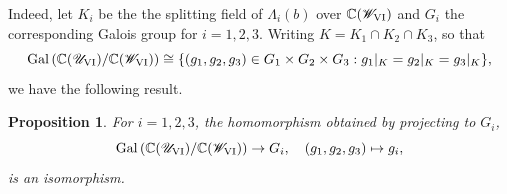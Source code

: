 \documentclass[a4paper,reqno]{amsart}
\numberwithin{equation}{section}
\newcommand{\C}{\mathbb{C}}
\newtheorem{proposition}[theorem]{Proposition}
\numberwithin{equation}{section}
\begin{document}
Indeed, let $K_i$ be the the splitting field of $\Lambda_i(b)$ over $\C(\mathscr{W}_{\rm{VI}})$ and $G_i$ the corresponding Galois group for $i=1,2,3$.
Writing $K=K_1\cap K_2\cap K_3$, so that 
\begin{equation*}
\operatorname{Gal}\left(\C(\mathscr{U}_{\rm{VI}})/\C(\mathscr{W}_{\rm{VI}})\right)\cong \{(g_1,g_2,g_3)\in G_1\times G_2\times G_3: g_1|_K=g_2|_K=g_3|_K\},
\end{equation*}
we have the following result.
\begin{proposition} \label{prop:galoisprojection}
For $i=1,2,3$, the homomorphism obtained by projecting to  $G_i$,
    \begin{equation}\label{eq:projectionG1}
 \operatorname{Gal}\left(\C(\mathscr{U}_{\rm{VI}})/\C(\mathscr{W}_{\rm{VI}})\right)\rightarrow G_i, \quad (g_1,g_2,g_3)\mapsto g_i,
\end{equation}
is an isomorphism.
\end{proposition}
\end{document}

